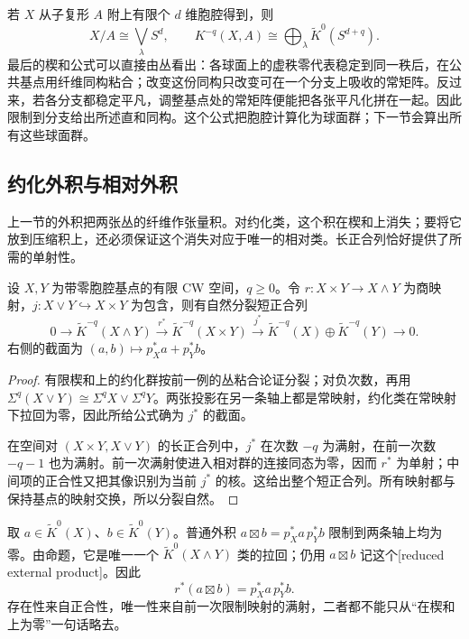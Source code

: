 \begin{example}\label{g2:exm:k-cells-relative}
	若 \(X\) 从子复形 \(A\) 附上有限个 \(d\) 维胞腔得到，则
	\[
		X/A\cong\bigvee_{\lambda}S^d,\qquad
		K^{-q}(X,A)\cong\bigoplus_{\lambda}\widetilde K^0(S^{d+q}).
	\]
	最后的楔和公式可以直接由丛看出：各球面上的虚秩零代表稳定到同一秩后，在公共基点用纤维同构粘合；改变这份同构只改变可在一个分支上吸收的常矩阵。反过来，若各分支都稳定平凡，调整基点处的常矩阵便能把各张平凡化拼在一起。因此限制到分支给出所述直和同构。这个公式把胞腔计算化为球面群；下一节会算出所有这些球面群。
\end{example}

\subsection{约化外积与相对外积}
\label{g2:subsec:2402:04}
上一节的外积把两张丛的纤维作张量积。对约化类，这个积在楔和上消失；要将它放到压缩积上，还必须保证这个消失对应于唯一的相对类。长正合列恰好提供了所需的单射性。

\begin{proposition}\label{g2:prop:k-product-wedge-splitting}
	设 \(X,Y\) 为带零胞腔基点的有限 CW 空间，\(q\ge0\)。令 \(r:X\times Y\to X\wedge Y\) 为商映射，\(j:X\vee Y\hookrightarrow X\times Y\) 为包含，则有自然分裂短正合列
	\[
		0\longrightarrow\widetilde K^{-q}(X\wedge Y)
		\xrightarrow{r^*}\widetilde K^{-q}(X\times Y)
		\xrightarrow{j^*}\widetilde K^{-q}(X)\oplus\widetilde K^{-q}(Y)
		\longrightarrow0.
	\]
	右侧的截面为 \((a,b)\mapsto p_X^*a+p_Y^*b\)。
\end{proposition}
\begin{proof}
	有限楔和上的约化群按前一例的丛粘合论证分裂；对负次数，再用 \(\Sigma^q(X\vee Y)\cong\Sigma^qX\vee\Sigma^qY\)。两张投影在另一条轴上都是常映射，约化类在常映射下拉回为零，因此所给公式确为 \(j^*\) 的截面。

	在空间对 \((X\times Y,X\vee Y)\) 的长正合列中，\(j^*\) 在次数 \(-q\) 为满射，在前一次数 \(-q-1\) 也为满射。前一次满射使进入相对群的连接同态为零，因而 \(r^*\) 为单射；中间项的正合性又把其像识别为当前 \(j^*\) 的核。这给出整个短正合列。所有映射都与保持基点的映射交换，所以分裂自然。
\end{proof}

取 \(a\in\widetilde K^0(X)\)、\(b\in\widetilde K^0(Y)\)。普通外积 \(a\boxtimes b=p_X^*a\,p_Y^*b\) 限制到两条轴上均为零。由命题，它是唯一一个 \(\widetilde K^0(X\wedge Y)\) 类的拉回；仍用 \(a\boxtimes b\) 记这个[reduced external product]。因此
\[
	r^*(a\boxtimes b)=p_X^*a\,p_Y^*b.
\]
存在性来自正合性，唯一性来自前一次限制映射的满射，二者都不能只从“在楔和上为零”一句话略去。

